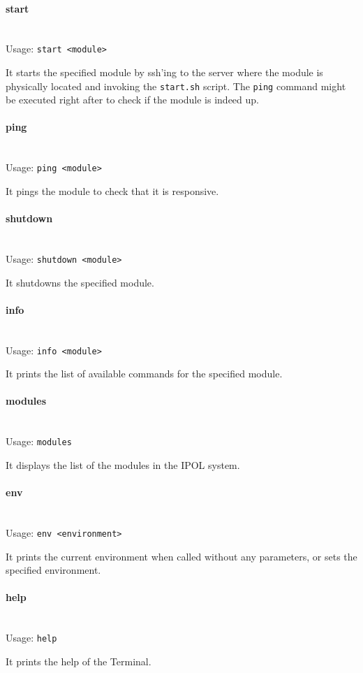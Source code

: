 \paragraph{start} \hspace{0pt} \\
Usage: {\tt start <module>}

It starts the specified module by ssh'ing to the server where the module is physically located and invoking the {\tt start.sh} script.
The {\tt ping} command might be executed right after to check if the module is indeed up.

\paragraph{ping} \hspace{0pt} \\
Usage: {\tt ping <module>}

It pings the module to check that it is responsive.

\paragraph{shutdown} \hspace{0pt} \\
Usage: {\tt shutdown <module>}

It shutdowns the specified module.

\paragraph{info} \hspace{0pt} \\
Usage: {\tt info <module>}

It prints the list of available commands for the specified module.

\paragraph{modules} \hspace{0pt} \\
Usage: {\tt modules}

It displays the list of the modules in the IPOL system.

\paragraph{env} \hspace{0pt} \\
Usage: {\tt env <environment>}

It prints the current environment when called without any parameters, or sets the specified environment.

\paragraph{help} \hspace{0pt} \\
Usage: {\tt help}

It prints the help of the Terminal.
